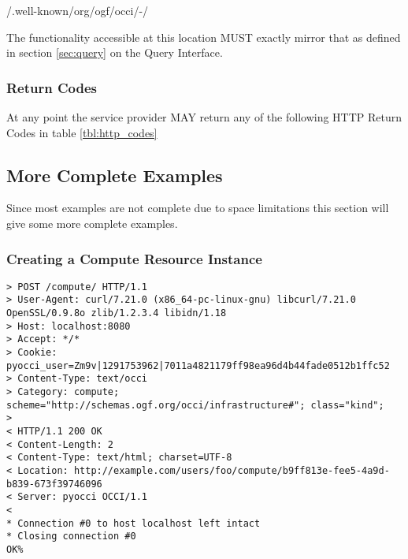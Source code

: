 \documentclass[10pt,a4paper]{article}
\begin{document}
/.well-known/org/ogf/occi/-/

The functionality accessible at this location MUST exactly mirror that
as defined in section \ref{sec:query} on the Query Interface.

\subsubsection{Return Codes}
\label{sec:return_codes}
At any point the service provider MAY return any of the following HTTP
Return Codes in table \ref{tbl:http_codes}


%
%

\subsection{More Complete Examples}
Since most examples are not complete due to space limitations this
section will give some more complete examples.

\subsubsection{Creating a Compute Resource Instance}
\begin{verbatim}
> POST /compute/ HTTP/1.1
> User-Agent: curl/7.21.0 (x86_64-pc-linux-gnu) libcurl/7.21.0 OpenSSL/0.9.8o zlib/1.2.3.4 libidn/1.18
> Host: localhost:8080
> Accept: */*
> Cookie: pyocci_user=Zm9v|1291753962|7011a4821179ff98ea96d4b44fade0512b1ffc52
> Content-Type: text/occi
> Category: compute; scheme="http://schemas.ogf.org/occi/infrastructure#"; class="kind";
> 
< HTTP/1.1 200 OK
< Content-Length: 2
< Content-Type: text/html; charset=UTF-8
< Location: http://example.com/users/foo/compute/b9ff813e-fee5-4a9d-b839-673f39746096
< Server: pyocci OCCI/1.1
< 
* Connection #0 to host localhost left intact
* Closing connection #0
OK% 
\end{verbatim}
\end{document}
